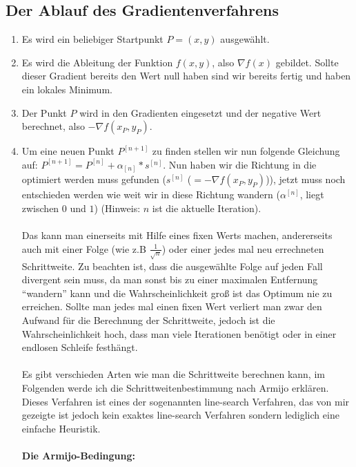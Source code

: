 \documentclass[naustrian]{article}
\begin{document}
{\subsection{Der Ablauf des Gradientenverfahrens}
\begin{enumerate}
    \item Es wird ein beliebiger Startpunkt $P=(x,y)$ ausgewählt.
    \item Es wird die Ableitung der Funktion $f(x,y)$, also ${\nabla}f(x)$
        gebildet. Sollte dieser Gradient bereits den Wert null haben sind
        wir bereits fertig und haben ein lokales Minimum.
    \item Der Punkt $P$ wird in den Gradienten eingesetzt und der negative
        Wert berechnet, also $-{\nabla}f(x_{P},y_{P})$.
    \item Um eine neuen Punkt $P^{[n+1]}$ zu finden stellen wir nun folgende
        Gleichung auf: $P^{[n+1]} = P^{[n]} + \alpha_{[n]} * s^{[n]}$. Nun
        haben wir die Richtung in die optimiert werden muss gefunden ($s^{[n]}$
        ($=-{\nabla}f(x_{P},y_{P})$)), jetzt muss noch entschieden werden
        wie weit wir in diese Richtung \textquotedbl{}wandern\textquotedbl{}
        ($\alpha^{[n]}$, liegt zwischen $0$ und $1$) (Hinweis: $n$ ist
        die aktuelle Iteration). \\\\ Das kann man einerseits mit Hilfe eines
        fixen Werts machen, andererseits auch mit einer Folge (wie z.B $\frac{1}{\sqrt{n}}$)
        oder einer jedes mal neu errechneten Schrittweite. Zu beachten ist,
        dass die ausgewählte Folge auf jeden Fall divergent sein muss, da
        man sonst bis zu einer maximalen Entfernung ``wandern''
        kann und die Wahrscheinlichkeit groß ist das Optimum nie zu erreichen.
        Sollte man jedes mal einen fixen Wert verliert man zwar den Aufwand
        für die Berechnung der Schrittweite, jedoch ist die Wahrscheinlichkeit
        hoch, dass man viele Iterationen benötigt oder in einer endlosen Schleife
        festhängt. \\\\ Es gibt verschieden Arten wie man die Schrittweite
        berechnen kann, im Folgenden werde ich die Schrittweitenbestimmung
        nach Armijo erklären. Dieses Verfahren ist eines der sogenannten \textquotedbl{}line-search\textquotedbl{}
        Verfahren, das von mir gezeigte ist jedoch kein exaktes line-search
        Verfahren sondern lediglich eine einfache Heuristik. \\\\ \textbf{Die Armijo-Bedingung:}

\end{enumerate}}
\end{document}
